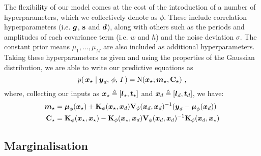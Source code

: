 \documentclass{acmtrans2m}
\begin{document}
The flexibility of our model comes at the cost of the introduction of a number of hyperparameters, which we collectively denote as $\phi$. These include correlation hyperparameters (i.e. $\boldsymbol{g}$, $\mathbf{s}$ and $\boldsymbol{d}$), along with others such as the periods and amplitudes of each covariance term (i.e. $w$ and $h$) and the noise deviation $\sigma$. The constant prior means $\mu_1,\ldots,\mu_M$ are also included as additional hyperparameters. Taking these hyperparameters as given and using the properties of the Gaussian distribution, we are able to write our predictive equations as
\begin{equation} \label{eq:GPMeanVar}
p\!\left(\,\boldsymbol{x}_\star\mid\boldsymbol{y}_d,\,\phi,\,I\,\right)=\text{N}\!\left(\boldsymbol{x}_\star;\boldsymbol{m}_\star,\mathbf{C}_\star\right)\,,
\end{equation}
where, collecting our inputs as $\boldsymbol{x}_\star\triangleq[\boldsymbol{l}_\star,\boldsymbol{t}_\star]$ and $\boldsymbol{x}_d\triangleq[\boldsymbol{l}_d,\boldsymbol{t}_d]$, we have:
\small\begin{align} \label{eq:GPMeanVar2}
\boldsymbol{m}_\star&=\boldsymbol{\mu}_\phi(\boldsymbol{x}_\star)+\mathbf{K}_\phi(\boldsymbol{x}_\star,\boldsymbol{x}_d)\mathbf{V}_\phi(\boldsymbol{x}_d,\boldsymbol{x}_d)^{-1}(\boldsymbol{y}_d-\boldsymbol{\mu}_\phi(\boldsymbol{x}_d))\nonumber\\
\mathbf{C}_\star&=\mathbf{K}_\phi(\boldsymbol{x}_\star,\boldsymbol{x}_\star)-\mathbf{K}_\phi(\boldsymbol{x}_\star,\boldsymbol{x}_d)\mathbf{V}_\phi(\boldsymbol{x}_d,\boldsymbol{x}_d)^{-1}\mathbf{K}_\phi(\boldsymbol{x}_d,\boldsymbol{x}_\star)
\end{align}\normalsize

\subsection{Marginalisation}
\end{document}
